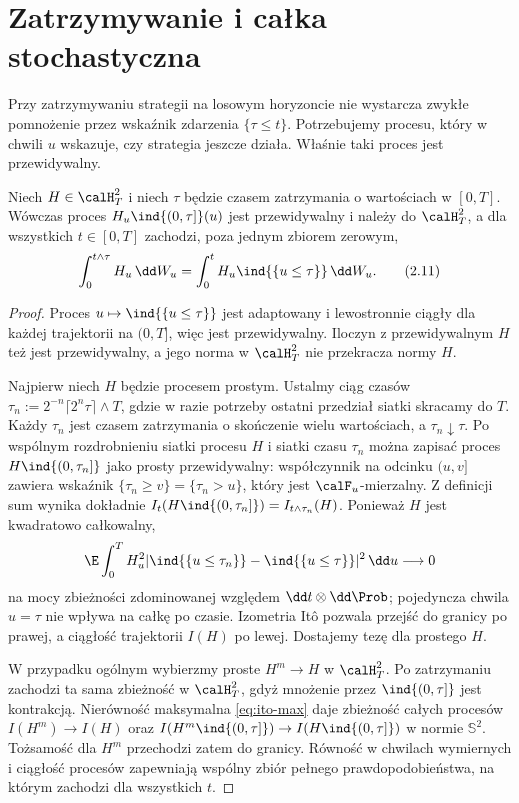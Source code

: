 \section{Zatrzymywanie i całka stochastyczna}
Przy zatrzymywaniu strategii na losowym horyzoncie nie
wystarcza zwykłe pomnożenie przez wskaźnik zdarzenia
$\{\tau\le t\}$. Potrzebujemy procesu, który w chwili $u$
wskazuje, czy strategia jeszcze działa. Właśnie taki proces
jest przewidywalny.

\begin{twierdzenie}\label{th:ito-stopping}
Niech $H\in\calH_T^2$ i niech $\tau$ będzie czasem
zatrzymania o wartościach w $[0,T]$. Wówczas proces
$H_u\ind{(0,\tau]}(u)$ jest przewidywalny i należy
do $\calH_T^2$, a dla wszystkich $t\in[0,T]$
zachodzi, poza jednym zbiorem zerowym,
\[
\int_0^{t\wedge\tau}H_u\,\dd W_u
=\int_0^t H_u\ind{\{u\le\tau\}}\,\dd W_u.
\tag{2.11}\label{eq:stopped-ito}
\]
\end{twierdzenie}
\begin{proof}
Proces $u\mapsto\ind{\{u\le\tau\}}$ jest adaptowany
i lewostronnie ciągły dla każdej trajektorii na $(0,T]$,
więc jest przewidywalny. Iloczyn z przewidywalnym $H$
też jest przewidywalny, a jego norma w $\calH_T^2$
nie przekracza normy $H$.

Najpierw niech $H$ będzie procesem prostym. Ustalmy
ciąg czasów $\tau_n:=2^{-n}\lceil2^n\tau\rceil\wedge T$,
gdzie w razie potrzeby ostatni przedział siatki skracamy
do $T$. Każdy $\tau_n$ jest czasem zatrzymania o skończenie
wielu wartościach, a $\tau_n\downarrow\tau$.
Po wspólnym rozdrobnieniu siatki procesu $H$ i siatki
czasu $\tau_n$ można zapisać proces
$H\ind{(0,\tau_n]}$ jako prosty przewidywalny:
współczynnik na odcinku $(u,v]$ zawiera wskaźnik
$\{\tau_n\ge v\}=\{\tau_n>u\}$, który jest
$\calF_u$-mierzalny. Z definicji sum wynika dokładnie
$I_t(H\ind{(0,\tau_n]})=I_{t\wedge\tau_n}(H)$.
Ponieważ $H$ jest kwadratowo całkowalny,
\[
\E\int_0^T H_u^2
|\ind{\{u\le\tau_n\}}-\ind{\{u\le\tau\}}|^2\,\dd u
\longrightarrow0
\]
na mocy zbieżności zdominowanej względem
$\dd t\otimes\dd\Prob$; pojedyncza chwila $u=\tau$
nie wpływa na całkę po czasie. Izometria Itô pozwala
przejść do granicy po prawej, a ciągłość trajektorii
$I(H)$ po lewej. Dostajemy tezę dla prostego $H$.

W przypadku ogólnym wybierzmy proste $H^m\to H$
w $\calH_T^2$. Po zatrzymaniu zachodzi ta sama
zbieżność w $\calH_T^2$, gdyż mnożenie przez
$\ind{(0,\tau]}$ jest kontrakcją.
Nierówność maksymalna \eqref{eq:ito-max} daje zbieżność
całych procesów $I(H^m)\to I(H)$ oraz
$I(H^m\ind{(0,\tau]})\to I(H\ind{(0,\tau]})$
w normie $\mathbb S^2$. Tożsamość dla $H^m$
przechodzi zatem do granicy. Równość w chwilach wymiernych
i ciągłość procesów zapewniają wspólny zbiór pełnego
prawdopodobieństwa, na którym zachodzi dla wszystkich $t$.
\end{proof}


